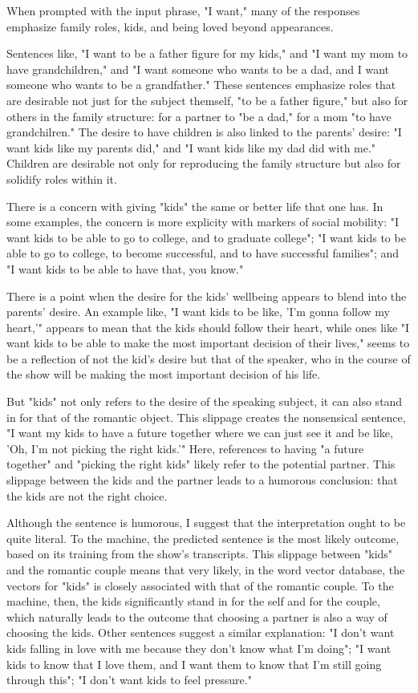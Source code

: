 \documentclass[11pt]{article}
\begin{document}
\begin{enumerate}
\begin{enumerate}
\begin{enumerate}
When prompted with the input phrase, "I want," many of the responses
emphasize family roles, kids, and being loved beyond appearances.  

Sentences like, "I want to be a father figure for my kids," and "I
want my mom to have grandchildren," and "I want someone who wants to
be a dad, and I want someone who wants to be a grandfather." These
sentences emphasize roles that are desirable not just for the subject
themself, "to be a father figure," but also for others in the family
structure: for a partner to "be a dad," for a mom "to have
grandchilren." The desire to have children is also linked to the
parents' desire: "I want kids like my parents did," and "I want kids
like my dad did with me." Children are desirable not only for
reproducing the family structure but also for solidify roles
within it.

There is a concern with giving "kids" the same or better life that one
has. In some examples, the concern is more explicity with markers of
social mobility: "I want kids to be able to go to college, and to
graduate college"; "I want kids to be able to go to college, to become
successful, and to have successful families"; and "I want kids to be
able to have that, you know."

There is a point when the desire for the kids' wellbeing appears to
blend into the parents' desire. An example like, "I want kids to be
like, 'I'm gonna follow my heart,'" appears to mean that the kids
should follow their heart, while ones like "I want kids to be able to
make the most important decision of their lives," seems to be a
reflection of not the kid's desire but that of the speaker, who in the
course of the show will be making the most important decision of his
life.

But "kids" not only refers to the desire of the speaking subject, it
can also stand in for that of the romantic object. This slippage
creates the nonsensical sentence, "I want my kids to have a future
together where we can just see it and be like, 'Oh, I'm not picking
the right kids.'" Here, references to having "a future together" and
"picking the right kids" likely refer to the potential partner. This
slippage between the kids and the partner leads to a humorous
conclusion: that the kids are not the right choice.

Although the sentence is humorous, I suggest that the interpretation
ought to be quite literal. To the machine, the predicted sentence is
the most likely outcome, based on its training from the show's
transcripts. This slippage between "kids" and the romantic couple
means that very likely, in the word vector database, the vectors for
"kids" is closely associated with that of the romantic couple. To the
machine, then, the kids significantly stand in for the self and for
the couple, which naturally leads to the outcome that choosing a
partner is also a way of choosing the kids. Other sentences suggest a
similar explanation: "I don't want kids falling in love with me
because they don't know what I'm doing"; "I want kids to know that I
love them, and I want them to know that I'm still going through this";
"I don't want kids to feel pressure."


\end{enumerate}
\end{enumerate}
\end{enumerate}
\end{document}
